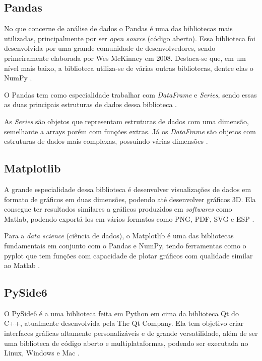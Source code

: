 \subsection{Pandas}

No que concerne de análise de dados o Pandas é uma das bibliotecas mais utilizadas, principalmente por ser \textit{open source} (código aberto). Essa biblioteca foi desenvolvida por uma grande comunidade de desenvolvedores, sendo primeiramente elaborada por Wes McKinney em 2008.  Destaca-se que, em um nível mais baixo, a biblioteca utiliza-se de várias outras bibliotecas, dentre elas o NumPy \cite{ref:mckinney_2022}.

O Pandas tem como especialidade trabalhar com \textit{DataFrame} e \textit{Series}, sendo essas as duas principais estruturas de dados dessa biblioteca \cite{ref:nelli_2023}.

As \textit{Series} são objetos que representam estruturas de dados com uma dimensão, semelhante a arrays porém com funções extras. Já os \textit{DataFrame} são objetos com estruturas de dados mais complexas, possuindo várias dimensões \cite{ref:nelli_2023}.

\subsection{Matplotlib}

A grande especialidade dessa biblioteca é desenvolver visualizações de dados em formato de gráficos em duas dimensões, podendo até desenvolver gráficos 3D. Ela consegue ter resultados similares a gráficos produzidos em \textit{softwares} como Matlab, podendo exportá-los em vários formatos como PNG, PDF, SVG e ESP \cite{ref:nelli_2023}.

Para a \textit{data science} (ciência de dados), o Matplotlib é uma das bibliotecas fundamentais em conjunto com o Pandas e NumPy, tendo ferramentas como o pyplot que tem funções com capacidade de plotar gráficos com qualidade similar ao Matlab \cite{ref:bisong_2019}.

\subsection{PySide6}

O PySide6 é a uma biblioteca feita em Python em cima da biblioteca Qt do C++, atualmente desenvolvida pela The Qt Company. Ela tem objetivo criar interfaces gráficas altamente personalizáveis e de grande versatilidade, além de ser uma biblioteca de código aberto e multiplataformas, podendo ser executada no Linux, Windows e Mac \cite{ref:fitzpatrick_2022}.
